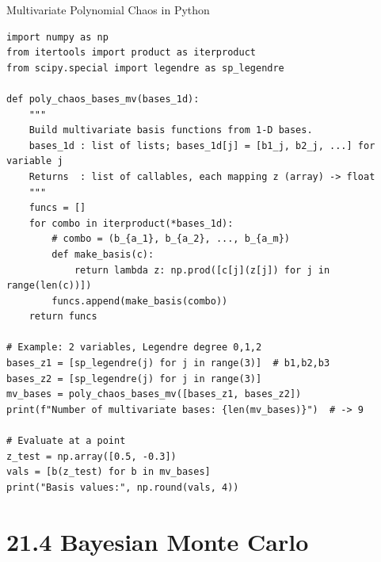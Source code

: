 \documentclass[aspectratio=169,10pt]{beamer}
\begin{document}
\begin{frame}[fragile]{Multivariate Polynomial Chaos in Python}
\begin{lstlisting}
import numpy as np
from itertools import product as iterproduct
from scipy.special import legendre as sp_legendre

def poly_chaos_bases_mv(bases_1d):
    """
    Build multivariate basis functions from 1-D bases.
    bases_1d : list of lists; bases_1d[j] = [b1_j, b2_j, ...] for variable j
    Returns  : list of callables, each mapping z (array) -> float
    """
    funcs = []
    for combo in iterproduct(*bases_1d):
        # combo = (b_{a_1}, b_{a_2}, ..., b_{a_m})
        def make_basis(c):
            return lambda z: np.prod([c[j](z[j]) for j in range(len(c))])
        funcs.append(make_basis(combo))
    return funcs

# Example: 2 variables, Legendre degree 0,1,2
bases_z1 = [sp_legendre(j) for j in range(3)]  # b1,b2,b3
bases_z2 = [sp_legendre(j) for j in range(3)]
mv_bases = poly_chaos_bases_mv([bases_z1, bases_z2])
print(f"Number of multivariate bases: {len(mv_bases)}")  # -> 9

# Evaluate at a point
z_test = np.array([0.5, -0.3])
vals = [b(z_test) for b in mv_bases]
print("Basis values:", np.round(vals, 4))
\end{lstlisting}
\end{frame}

\section{21.4 Bayesian Monte Carlo}
\end{document}
